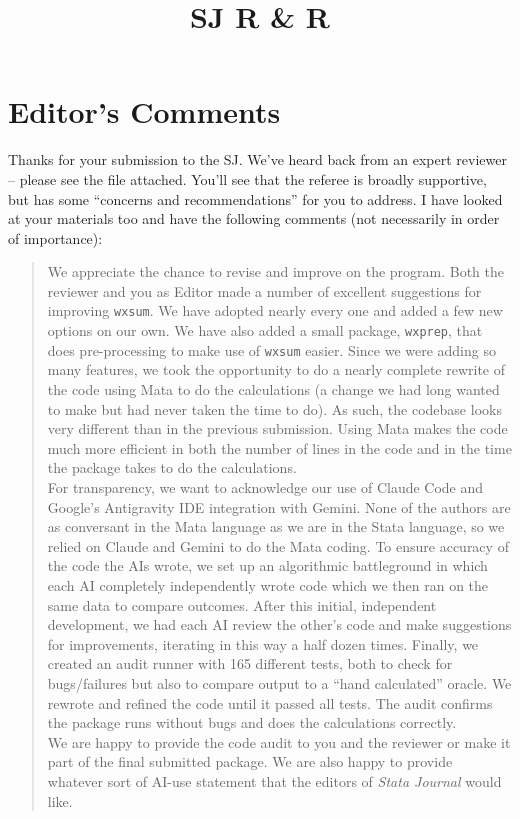 \documentclass{article}[11pt]
\title{SJ R \& R}
\author{}
\date{}
\begin{document}
\setlength{\parindent}{0pt} %
\setlength{\parskip}{\smallskipamount}

\pagestyle{fancy}
\fancyhead{} %
\renewcommand{\thetable}{E-\arabic{table}}
\renewcommand{\thefigure}{E-\arabic{figure}}

\onehalfspacing
\section*{Editor's Comments}

Thanks for your submission to the SJ. We've heard back from an expert reviewer – please see the file attached. You’ll see that the referee is broadly supportive, but has some “concerns and recommendations” for you to address. I have looked at your materials too and have the following comments (not necessarily in order of importance):
    \begin{quote}
        We appreciate the chance to revise and improve on the program. Both the reviewer and you as Editor made a number of excellent suggestions for improving \texttt{wxsum}. We have adopted nearly every one and added a few new options on our own. We have also added a small package, \texttt{wxprep}, that does pre-processing to make use of \texttt{wxsum} easier. Since we were adding so many features, we took the opportunity to do a nearly complete rewrite of the code using Mata to do the calculations (a change we had long wanted to make but had never taken the time to do). As such, the codebase looks very different than in the previous submission. Using Mata makes the code much more efficient in both the number of lines in the code and in the time the package takes to do the calculations. \\

        For transparency, we want to acknowledge our use of Claude Code and Google's Antigravity IDE integration with Gemini. None of the authors are as conversant in the Mata language as we are in the Stata language, so we relied on Claude and Gemini to do the Mata coding. To ensure accuracy of the code the AIs wrote, we set up an algorithmic battleground in which each AI completely independently wrote code which we then ran on the same data to compare outcomes. After this initial, independent development, we had each AI review the other's code and make suggestions for improvements, iterating in this way a half dozen times. Finally, we created an audit runner with 165 different tests, both to check for bugs/failures but also to compare output to a ``hand calculated'' oracle. We rewrote and refined the code until it passed all tests. The audit confirms the package runs without bugs and does the calculations correctly. \\

        We are happy to provide the code audit to you and the reviewer or make it part of the final submitted package. We are also happy to provide whatever sort of AI-use statement that the editors of \emph{Stata Journal} would like.
    \end{quote}
\end{document}
